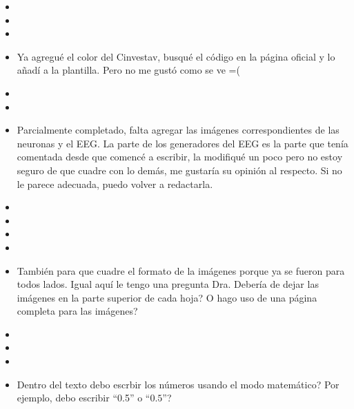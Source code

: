 %



\begin{itemize}
	\item {} 
	\item {}
	\item {}
	\item {} Ya agregué el color del Cinvestav, busqué el código en la página oficial y lo añadí a la plantilla. Pero no me gustó como se ve =(
	\item {}
	\item {}
	\item {} Parcialmente completado, falta agregar las imágenes correspondientes de las neuronas y el EEG. La parte de los generadores del EEG es la parte que tenía comentada desde que comencé a escribir, la modifiqué un poco pero no estoy seguro de que cuadre con lo demás, me gustaría su opinión al respecto. Si no le parece adecuada, puedo volver a redactarla.
	\item {}
	\item {}
	\item {}
	\item {}
	\item {} También para que cuadre el formato de la imágenes porque ya se fueron para todos lados. Igual aquí le tengo una pregunta Dra. Debería de dejar las imágenes en la parte superior de cada hoja? O hago uso de una página completa para las imágenes?
	\item {}
	\item {}
	\item {}
	\item {} Dentro del texto debo escrbir los números usando el modo matemático? Por ejemplo, debo escribir ``0.5'' o ``$0.5$''?
\end{itemize}
